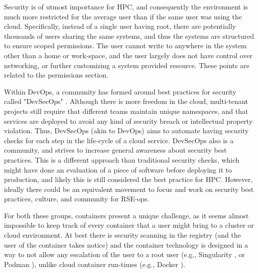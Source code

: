 
Security is of utmost importance for HPC, and consequently the environment is much more restricted for the average user than if the same user was using the cloud. Specifically, instead of a single user having root, there are potentially thousands of users sharing the same systems, and thus the systems are structured to ensure scoped permissions. The user cannot write to anywhere in the system other than
a home or work-space, and the user largely does not have control over networking, or further customizing a system provided resource. These points are related to the permissions section.

Within DevOps, a community has formed around best practices for security called "DevSecOps" \cite{noauthor_undated-yd}. Although there is more freedom in the cloud, multi-tenant projects still require that different teams maintain unique namespaces, and that services are  deployed to avoid any kind of security breach or intellectual property violation. Thus, DevSecOps (akin to DevOps) aims to automate having security checks for
each step in the life-cycle of a cloud service. DevSecOps also is a community, and strives to increase general awareness about security best practices. This is a different approach than traditional security checks, which might have done an evaluation of a piece of software before deploying it to production, and likely this is still considered the best practice for HPC. However, ideally there could be an equivalent movement to focus and work on security best practices, culture, and community for RSE-ops.

For both these groups, containers present a unique challenge, as it seems almost impossible to keep track of every container that a user might bring to a cluster or cloud environment. At best there is security scanning in the registry (and the user of the container takes notice) and the container technology is designed in a way to not allow any escalation of the user to a root user (e.g., Singularity \cite{singularity}, or Podman \cite{podman}), unlike cloud container run-times (e.g., Docker \cite{docker}).
